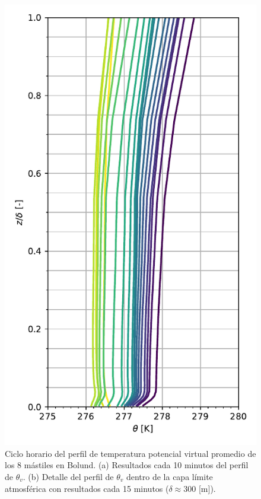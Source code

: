 \begin{figure}[H]
\begin{minipage}{0.5\linewidth}
	\end{minipage}%
	\begin{minipage}{0.5\linewidth}
		\centering
		\includegraphics[width=0.9\linewidth,trim={0cm 5mm 0cm 0cm},clip]{Imagenes/06/bol/mean_profile}%
	\end{minipage}%
	
	\caption{Ciclo horario del perfil de temperatura potencial virtual promedio de los 8 mástiles en Bolund. (a) Resultados cada 10 minutos del perfil de $\theta_v$. (b) Detalle del perfil de $\theta_v$ dentro de la capa límite atmosférica con resultados cada 15 minutos ($\delta\approx300$ [m]).}
	\label{fig:06_bol_pbl}
\end{figure}
\vspace*{\fill}
\newpage
